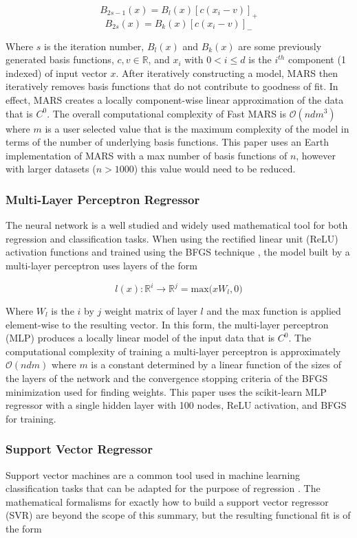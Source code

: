 \documentclass{scspaperproc}
\theoremstyle{scsthe}
\begin{document}
$$ B_{2s-1}(x) = B_l(x) [c(x_i-v)]_+ $$
$$ B_{2s}(x) = B_k(x) [c(x_i-v)]_- $$

Where $s$ is the iteration number, $B_l(x)$ and $B_k(x)$ are some
previously generated basis functions, $c, v \in \mathbb{R}$, and $x_i$
with $0 < i \leq d$ is the $i^{th}$ component (1 indexed) of input
vector $x$. After iteratively constructing a model, MARS then
iteratively removes basis functions that do not contribute to goodness
of fit. In effect, MARS creates a locally component-wise linear
approximation of the data that is $C^0$. The overall computational
complexity of Fast MARS is $\mathcal{O}(n d m^3)$ where $m$ is a user
selected value that is the maximum complexity of the model in terms of
the number of underlying basis functions. This paper uses an Earth
implementation of MARS \cite{rudy2017pyearth} with a max number of
basis functions of $n$, however with larger datasets ($n > 1000$) this
value would need to be reduced.

\subsubsection{Multi-Layer Perceptron Regressor}
The neural network is a well studied and widely used mathematical tool
for both regression and classification tasks.
\cite{hornik1989multilayer} When using the rectified linear unit
(ReLU) activation functions \cite{dahl2013improving} and trained using
the BFGS technique \cite{moller1993scaled}, the model built by a
multi-layer perceptron uses layers of the form

$$l(x) : \mathbb{R}^{i} \rightarrow \mathbb{R}^{j} = \text{max}\big( x
W_l, 0 \big)$$

Where $W_l$ is the $i$ by $j$ weight matrix of layer $l$ and the max
function is applied element-wise to the resulting vector. In this
form, the multi-layer perceptron (MLP) produces a locally linear model
of the input data that is $C^0$. The computational complexity of
training a multi-layer perceptron is approximately $\mathcal{O}(n d
m)$ where $m$ is a constant determined by a linear function of the
sizes of the layers of the network and the convergence stopping
criteria of the BFGS minimization used for finding weights. This paper
uses the scikit-learn MLP regressor \cite{scikit-learn} with a single
hidden layer with 100 nodes, ReLU activation, and BFGS for training.

\subsubsection{Support Vector Regressor}
Support vector machines are a common tool used in machine learning
classification tasks that can be adapted for the purpose of regression
\cite{basak2007support}. The mathematical formalisms for exactly how
to build a support vector regressor (SVR) are beyond the scope of this
summary, but the resulting functional fit is of the form
\end{document}

